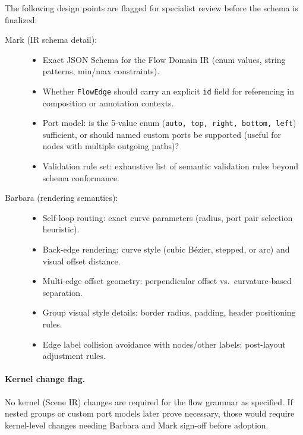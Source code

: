 The following design points are flagged for specialist review before the schema is finalized:

\begin{description}
  \item[Mark (IR schema detail):]
  \begin{itemize}
    \item Exact JSON Schema for the Flow Domain IR (enum values, string patterns, min/max constraints).
    \item Whether \texttt{FlowEdge} should carry an explicit \texttt{id} field for referencing in composition or annotation contexts.
    \item Port model: is the 5-value enum (\texttt{auto, top, right, bottom, left}) sufficient, or should named custom ports be supported (useful for nodes with multiple outgoing paths)?
    \item Validation rule set: exhaustive list of semantic validation rules beyond schema conformance.
  \end{itemize}
  
  \item[Barbara (rendering semantics):]
  \begin{itemize}
    \item Self-loop routing: exact curve parameters (radius, port pair selection heuristic).
    \item Back-edge rendering: curve style (cubic B\'ezier, stepped, or arc) and visual offset distance.
    \item Multi-edge offset geometry: perpendicular offset vs.\ curvature-based separation.
    \item Group visual style details: border radius, padding, header positioning rules.
    \item Edge label collision avoidance with nodes/other labels: post-layout adjustment rules.
  \end{itemize}
\end{description}

\paragraph{Kernel change flag.}
No kernel (Scene IR) changes are required for the flow grammar as specified. If nested groups or custom port models later prove necessary, those would require kernel-level changes needing Barbara and Mark sign-off before adoption.
